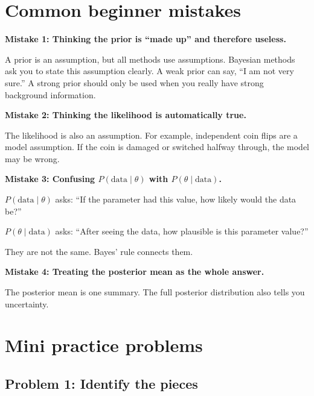 \documentclass[11pt]{article}
\newcommand{\data}{\text{data}}
\begin{document}
\section{Common beginner mistakes}

\begin{warningbox}
\textbf{Mistake 1: Thinking the prior is ``made up'' and therefore useless.}

A prior is an assumption, but all methods use assumptions. Bayesian methods ask you to state this assumption clearly. A weak prior can say, ``I am not very sure.'' A strong prior should only be used when you really have strong background information.
\end{warningbox}

\begin{warningbox}
\textbf{Mistake 2: Thinking the likelihood is automatically true.}

The likelihood is also an assumption. For example, independent coin flips are a model assumption. If the coin is damaged or switched halfway through, the model may be wrong.
\end{warningbox}

\begin{warningbox}
\textbf{Mistake 3: Confusing $P(\data\mid\theta)$ with $P(\theta\mid\data)$.}

$P(\data\mid\theta)$ asks: ``If the parameter had this value, how likely would the data be?''

$P(\theta\mid\data)$ asks: ``After seeing the data, how plausible is this parameter value?''

They are not the same. Bayes' rule connects them.
\end{warningbox}

\begin{warningbox}
\textbf{Mistake 4: Treating the posterior mean as the whole answer.}

The posterior mean is one summary. The full posterior distribution also tells you uncertainty.
\end{warningbox}

\section{Mini practice problems}

\subsection*{Problem 1: Identify the pieces}
\end{document}
